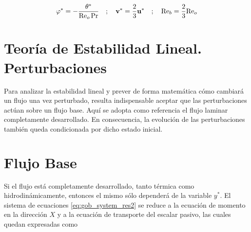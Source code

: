 \begin{equation*}
\varphi^* = -  \frac{\theta^*}{\text{Re}_o \hspace{0.5mm} \text{Pr}}  \quad ; \quad \mathbf{v^*} = \frac{2}{3} \mathbf{u^*} \quad ; \quad \text{Re}_b = \frac{2}{3} \text{Re}_o
\end{equation*}  

\newpage
\section{Teoría de Estabilidad Lineal. Perturbaciones} \label{line_an}

Para analizar la estabilidad lineal y prever de forma matemática cómo cambiará un flujo una vez perturbado, resulta indispensable aceptar que las perturbaciones actúan sobre un flujo base. Aquí se adopta como referencia el flujo laminar completamente desarrollado. En consecuencia, la evolución de las perturbaciones también queda condicionada por dicho estado inicial.



\section{Flujo Base}

Si el flujo está completamente desarrollado, tanto térmica como hidrodinámicamente, entonces el mismo sólo dependerá de la variable $y^*$. El sistema de ecuaciones \ref{eq:gob_system_res2} se reduce a la ecuación de momento en la dirección $X$ y a la ecuación de transporte del escalar pasivo, las cuales quedan expresadas como 

